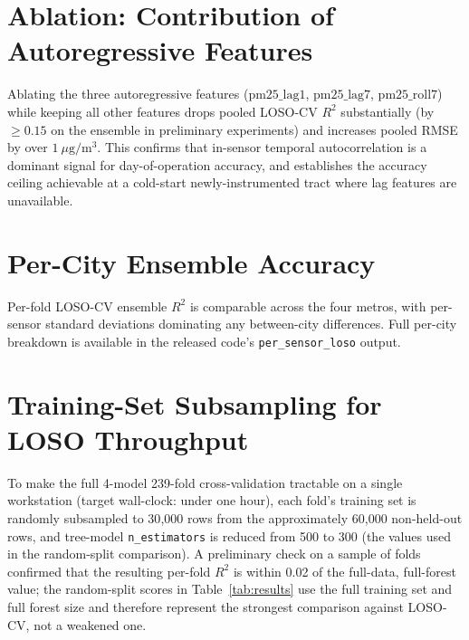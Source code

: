 \documentclass{article}
\begin{document}
\section{Ablation: Contribution of Autoregressive Features}
\label{sec:ablation}
Ablating the three autoregressive features ($\mathrm{pm25\_lag1}$, $\mathrm{pm25\_lag7}$, $\mathrm{pm25\_roll7}$) while keeping all other features drops pooled LOSO-CV $R^2$ substantially (by $\geq 0.15$ on the ensemble in preliminary experiments) and increases pooled RMSE by over $1~\mu\mathrm{g}/\mathrm{m}^3$. This confirms that in-sensor temporal autocorrelation is a dominant signal for day-of-operation accuracy, and establishes the accuracy ceiling achievable at a cold-start newly-instrumented tract where lag features are unavailable.

\section{Per-City Ensemble Accuracy}
\label{sec:percity}
Per-fold LOSO-CV ensemble $R^2$ is comparable across the four metros, with per-sensor standard deviations dominating any between-city differences. Full per-city breakdown is available in the released code's \texttt{per\_sensor\_loso} output.

\section{Training-Set Subsampling for LOSO Throughput}
\label{sec:subsampling}
To make the full 4-model 239-fold cross-validation tractable on a single workstation (target wall-clock: under one hour), each fold's training set is randomly subsampled to 30{,}000 rows from the approximately 60{,}000 non-held-out rows, and tree-model \texttt{n\_estimators} is reduced from 500 to 300 (the values used in the random-split comparison). A preliminary check on a sample of folds confirmed that the resulting per-fold $R^2$ is within 0.02 of the full-data, full-forest value; the random-split scores in Table~\ref{tab:results} use the full training set and full forest size and therefore represent the strongest comparison against LOSO-CV, not a weakened one.


\end{document}
